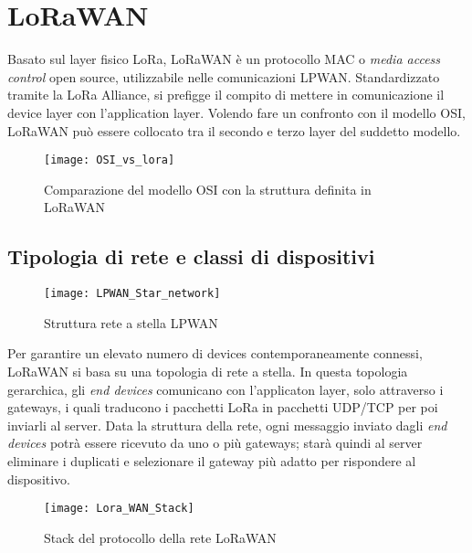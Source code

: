 \section{LoRaWAN}

Basato sul layer fisico LoRa, LoRaWAN è un protocollo
MAC o \emph{media access control} open source, utilizzabile nelle comunicazioni
LPWAN. 
Standardizzato tramite la LoRa Alliance, si prefigge il compito di mettere in
comunicazione il device layer con l'application layer.
Volendo fare un confronto con il modello OSI, LoRaWAN può essere collocato tra il
secondo e terzo layer del suddetto modello. 

\begin{figure}[ht]
\centering 
\texttt{[image: OSI\_vs\_lora]}
\caption{Comparazione del modello OSI con la struttura definita in LoRaWAN}
\label{}
\end{figure}

\subsection{Tipologia di rete e classi di dispositivi}
\begin{figure}[ht]
\centering 
\texttt{[image: LPWAN\_Star\_network]}
\caption{Struttura rete a stella LPWAN}
\end{figure}
Per garantire un elevato numero di devices contemporaneamente connessi, LoRaWAN
si basa su una topologia di rete a stella.
In questa topologia gerarchica, gli \emph{end devices} comunicano con
l'applicaton layer, solo attraverso i gateways, i quali traducono i pacchetti LoRa in pacchetti
UDP/TCP per poi inviarli al server.
Data la struttura della rete,  ogni messaggio inviato dagli \emph{end devices} potrà essere ricevuto da uno o più
gateways; starà quindi al server eliminare i duplicati e selezionare il gateway
più adatto per rispondere al dispositivo.

\begin{figure}[ht]
\centering 
\texttt{[image: Lora\_WAN\_Stack]}
\caption{Stack del protocollo della rete LoRaWAN}
\label{fig:stack_lora}
\end{figure}

